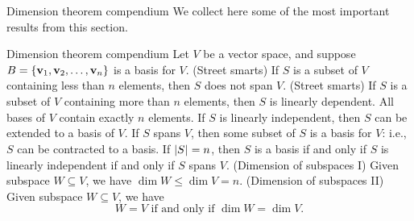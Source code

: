 \begin{frame}{Dimension theorem compendium}
 We collect here some of the most important results from this section. 
\begin{theorem}{Dimension theorem compendium}
Let $V$ be a vector space, and suppose $B=\{{\mathbf v}_1,{\mathbf v}_2,\dots, {\mathbf v}_n\}$ is a basis for $V$. 
\bb[(a)]
\ii (Street smarts) If $S$ is a subset of $V$ containing less than $n$ elements, then $S$ does not span $V$.
\ii (Street smarts) If $S$ is a subset of $V$ containing more than $n$ elements, then $S$ is linearly dependent. 
\ii All bases of $V$ contain exactly $n$ elements. 
\ii If $S$ is linearly independent, then $S$ can be extended to a basis of $V$. 
\ii If $S$ spans $V$, then some subset of $S$ is a basis for $V$: i.e., $S$ can be contracted to a basis. 
\ii If $\left\lvert S\right\rvert_{}=n$, then $S$ is a basis if and only if $S$ is linearly independent if and only if $S$ spans $V$. 
\ii (Dimension of subspaces I) Given subspace $W\subseteq V$, we have $\dim W\leq \dim V=n$. 
\ii (Dimension of subspaces II) Given subspace $W\subseteq V$, we have 
\[
W=V \text{ if and only if } \dim W=\dim V.
\]
\ee
\end{theorem}

\end{frame}